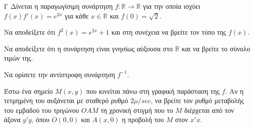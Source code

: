 \begin{thema}{Γ}
Δίνεται η παραγωγίσιμη συνάρτηση $f: \mathbb{R} \to \mathbb{R}$ για την οποία ισχύει $f(x)f'(x) = e^{2x}$ για κάθε $x \in \mathbb{R}$ και $f(0) = \sqrt{2}$. 
\begin{erwthma}
  \item Να αποδείξετε ότι $f^2(x) = e^{2x} + 1$ και στη συνέχεια να βρείτε τον τύπο της $f(x)$.
  \item Να αποδείξετε ότι η συνάρτηση είναι γνησίως αύξουσα στο $\mathbb{R}$ και να βρείτε το σύνολο τιμών της.
  \item Να ορίσετε την αντίστροφη συνάρτηση $f^{-1}$.
  \item Έστω ένα σημείο $M(x, y)$ που κινείται πάνω στη γραφική παράσταση της $f$. Αν η τετμημένη του αυξάνεται με σταθερό ρυθμό $2 \mu/\si{sec}$, να βρείτε τον ρυθμό μεταβολής του εμβαδού του τριγώνου $OAM$ τη χρονική στιγμή που το $M$ διέρχεται από τον άξονα $y'y$, όπου $O(0,0)$ και $A(x, 0)$ η προβολή του $M$ στον $x'x$.
\end{erwthma}
\end{thema}
